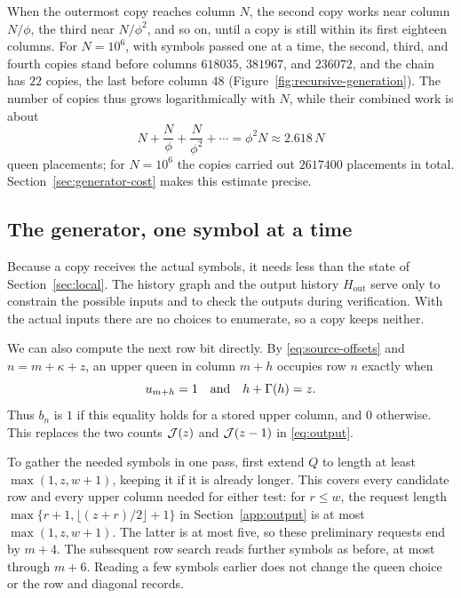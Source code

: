 When the outermost copy reaches column $N$, the second copy works
near column $N/\phi$, the third near $N/\phi^2$, and so on, until a
copy is still within its first eighteen columns. For $N=10^6$, with
symbols passed one at a time, the second, third, and fourth copies
stand before columns $618035$, $381967$, and $236072$, and the chain
has $22$ copies, the last before column $48$
(Figure~\ref{fig:recursive-generation}). The number of copies thus grows logarithmically
with $N$, while their combined work is about
\[
 N+\frac{N}{\phi}+\frac{N}{\phi^2}+\cdots=\phi^2N\approx2.618\,N
\]
queen placements; for $N=10^6$ the copies carried out $2617400$
placements in total. Section~\ref{sec:generator-cost} makes this
estimate precise.



\subsection{The generator, one symbol at a time}\label{sec:generator-records}

Because a copy receives the actual symbols, it needs less than the
state of Section~\ref{sec:local}. The history graph and the output
history $H_{\mathrm{out}}$ serve only to constrain the possible inputs
and to check the outputs during verification. With the actual inputs there are
no choices to enumerate, so a copy keeps neither.

We can also compute the next row bit directly. By
\eqref{eq:source-offsets} and $n=m+\kappa+z$, an upper queen in column
$m+h$ occupies row $n$ exactly when
\begin{equation}\label{eq:generator-row-bit}
 u_{m+h}=1\quad\hbox{and}\quad h+\Gamma(h)=z.
\end{equation}
Thus $b_n$ is $1$ if this equality holds for a stored upper column,
and $0$ otherwise. This replaces the two counts $\mathcal J(z)$ and $\mathcal J(z-1)$
in \eqref{eq:output}.

To gather the needed symbols in one pass, first extend $Q$ to length
at least $\max(1,z,w+1)$, keeping it if it is already longer. This
covers every candidate row and every upper column needed for either
test: for $r\le w$, the request length
$\max\{r+1,\lfloor(z+r)/2\rfloor+1\}$ in Section~\ref{app:output} is at
most $\max(1,z,w+1)$. The latter is at most five, so these
preliminary requests end by $m+4$. The subsequent row search reads
further symbols as before, at most through $m+6$. Reading a few
symbols earlier does not change the queen choice or the row and
diagonal records.

